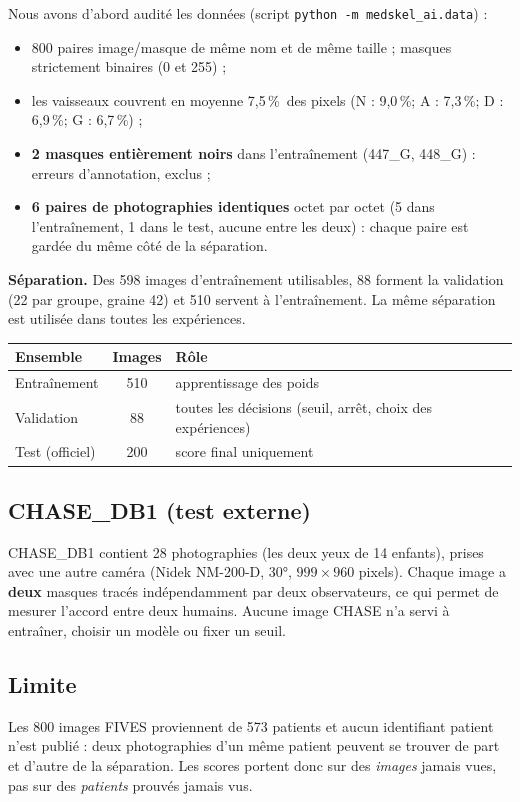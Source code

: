 \documentclass[11pt,a4paper]{article}
\newcommand{\pct}{\,\%}
\begin{document}
Nous avons d'abord audité les données (script \texttt{python -m medskel\_ai.data}) :
\begin{itemize}
  \item 800 paires image/masque de même nom et de même taille ; masques strictement binaires (0 et 255) ;
  \item les vaisseaux couvrent en moyenne 7,5\pct\ des pixels (N : 9,0\pct ; A : 7,3\pct ; D : 6,9\pct ; G : 6,7\pct) ;
  \item \textbf{2 masques entièrement noirs} dans l'entraînement (447\_G, 448\_G) : erreurs d'annotation, exclus ;
  \item \textbf{6 paires de photographies identiques} octet par octet (5 dans l'entraînement, 1 dans le test, aucune entre les deux) : chaque paire est gardée du même côté de la séparation.
\end{itemize}

\textbf{Séparation.} Des 598 images d'entraînement utilisables, 88 forment la validation (22 par groupe, graine 42) et 510 servent à l'entraînement. La même séparation est utilisée dans toutes les expériences.

\begin{center}
\begin{tabular}{@{}lcl@{}}
\toprule
\textbf{Ensemble} & \textbf{Images} & \textbf{Rôle} \\
\midrule
Entraînement & 510 & apprentissage des poids \\
Validation & 88 & toutes les décisions (seuil, arrêt, choix des expériences) \\
Test (officiel) & 200 & score final uniquement \\
\bottomrule
\end{tabular}
\end{center}

\subsection{CHASE\_DB1 (test externe)}
CHASE\_DB1 \cite{chase} contient 28 photographies (les deux yeux de 14 enfants), prises avec une autre caméra (Nidek NM-200-D, 30°, $999\times960$ pixels). Chaque image a \textbf{deux} masques tracés indépendamment par deux observateurs, ce qui permet de mesurer l'accord entre deux humains. Aucune image CHASE n'a servi à entraîner, choisir un modèle ou fixer un seuil.

\subsection{Limite}
Les 800 images FIVES proviennent de 573 patients et aucun identifiant patient n'est publié : deux photographies d'un même patient peuvent se trouver de part et d'autre de la séparation. Les scores portent donc sur des \emph{images} jamais vues, pas sur des \emph{patients} prouvés jamais vus.
\end{document}
